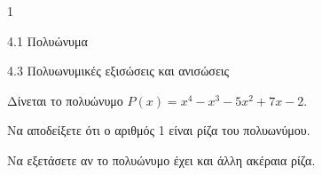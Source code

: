 \begin{ylh}{1}
\item 4.1 Πολυώνυμα
\item 4.3 Πολυωνυμικές εξισώσεις και ανισώσεις
\end{ylh}
Δίνεται το πολυώνυμο $P(x) = x^4 - x^3 - 5x^2 + 7x - 2$.
\begin{alist}
\item Να αποδείξετε ότι ο αριθμός 1 είναι ρίζα του πολυωνύμου.
\item Να εξετάσετε αν το πολυώνυμο έχει και άλλη ακέραια ρίζα.
\end{alist}

